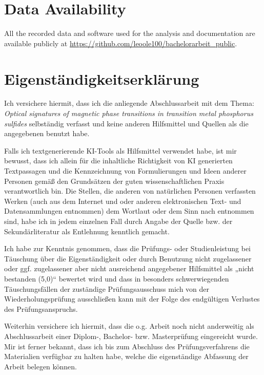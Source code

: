 \documentclass[
	twoside,
	parskip=half,
	a4paper,
]{scrbook}
\begin{document}
\backmatter
\nocite{*}
\printbibliography

\section*{Data Availability}
All the recorded data and software used for the analysis and documentation are available publicly at \url{https://github.com/leoole100/bachelorarbeit_public}.


\clearpage
\section*{Eigenständigkeitserklärung}

Ich versichere hiermit, dass ich die anliegende Abschlussarbeit mit dem Thema:
\textit{Optical signatures of magnetic phase transitions in transition metal phosphorus sulfides}
selbständig verfasst und keine anderen Hilfsmittel und Quellen als die angegebenen benutzt habe.

Falls ich textgenerierende KI-Tools als Hilfsmittel verwendet habe, ist mir bewusst, dass ich allein für
die inhaltliche Richtigkeit von KI generierten Textpassagen und die Kennzeichnung von
Formulierungen und Ideen anderer Personen gemäß den Grundsätzen der guten wissenschaftlichen
Praxis verantwortlich bin. Die Stellen, die anderen von natürlichen Personen verfassten Werken (auch
aus dem Internet und oder anderen elektronischen Text- und Datensammlungen entnommen) dem
Wortlaut oder dem Sinn nach entnommen sind, habe ich in jedem einzelnen Fall durch Angabe der
Quelle bzw. der Sekundärliteratur als Entlehnung kenntlich gemacht.

Ich habe zur Kenntnis genommen, dass die Prüfungs- oder Studienleistung bei Täuschung über die
Eigenständigkeit oder durch Benutzung nicht zugelassener oder ggf. zugelassener aber nicht
ausreichend angegebener Hilfsmittel als „nicht bestanden (5,0)“ bewertet wird und dass in besonders
schwerwiegenden Täuschungsfällen der zuständige Prüfungsausschuss mich von der
Wiederholungsprüfung ausschließen kann mit der Folge des endgültigen Verlustes des
Prüfungsanspruchs.

Weiterhin versichere ich hiermit, dass die o.g. Arbeit noch nicht anderweitig als Abschlussarbeit einer
Diplom-, Bachelor- bzw. Masterprüfung eingereicht wurde. Mir ist ferner bekannt, dass ich bis zum
Abschluss des Prüfungsverfahrens die Materialien verfügbar zu halten habe, welche die
eigenständige Abfassung der Arbeit belegen können.
\end{document}
